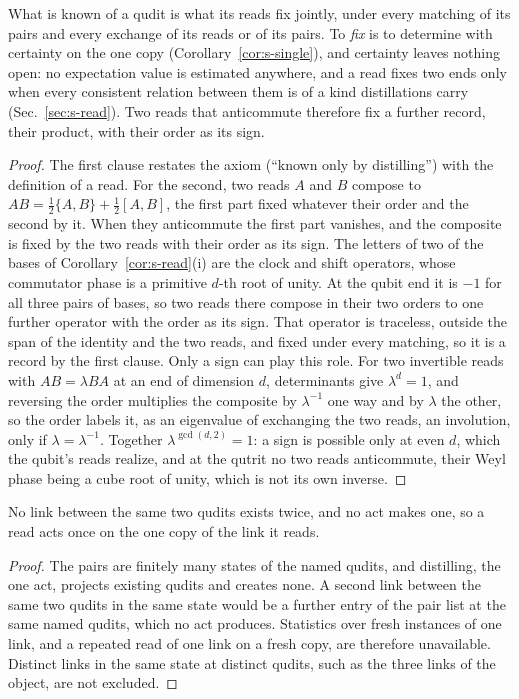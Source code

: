 \begin{corollary}
\label{cor:s-known}
What is known of a qudit is what its reads fix jointly, under every matching of its pairs and every exchange of its reads or of its pairs. To \emph{fix} is to determine with certainty on the one copy (Corollary~\ref{cor:s-single}), and certainty leaves nothing open: no expectation value is estimated anywhere, and a read fixes two ends only when every consistent relation between them is of a kind distillations carry (Sec.~\ref{sec:s-read}). Two reads that anticommute therefore fix a further record, their product, with their order as its sign.
\end{corollary}
\begin{proof}
The first clause restates the axiom (``known only by distilling'') with the definition of a read. For the second, two reads $A$ and $B$ compose to $AB=\tfrac12\{A,B\}+\tfrac12[A,B]$, the first part fixed whatever their order and the second by it. When they anticommute the first part vanishes, and the composite is fixed by the two reads with their order as its sign. The letters of two of the bases of Corollary~\ref{cor:s-read}(i) are the clock and shift operators, whose commutator phase is a primitive $d$-th root of unity. At the qubit end it is $-1$ for all three pairs of bases, so two reads there compose in their two orders to one further operator with the order as its sign. That operator is traceless, outside the span of the identity and the two reads, and fixed under every matching, so it is a record by the first clause. Only a sign can play this role. For two invertible reads with $AB=\lambda BA$ at an end of dimension $d$, determinants give $\lambda^{d}=1$, and reversing the order multiplies the composite by $\lambda^{-1}$ one way and by $\lambda$ the other, so the order labels it, as an eigenvalue of exchanging the two reads, an involution, only if $\lambda=\lambda^{-1}$. Together $\lambda^{\gcd(d,2)}=1$: a sign is possible only at even $d$, which the qubit's reads realize, and at the qutrit no two reads anticommute, their Weyl phase being a cube root of unity, which is not its own inverse.
\end{proof}

\begin{corollary}
\label{cor:s-single}
No link between the same two qudits exists twice, and no act makes one, so a read acts once on the one copy of the link it reads.
\end{corollary}
\begin{proof}
The pairs are finitely many states of the named qudits, and distilling, the one act, projects existing qudits and creates none. A second link between the same two qudits in the same state would be a further entry of the pair list at the same named qudits, which no act produces. Statistics over fresh instances of one link, and a repeated read of one link on a fresh copy, are therefore unavailable. Distinct links in the same state at distinct qudits, such as the three links of the object, are not excluded.
\end{proof}

